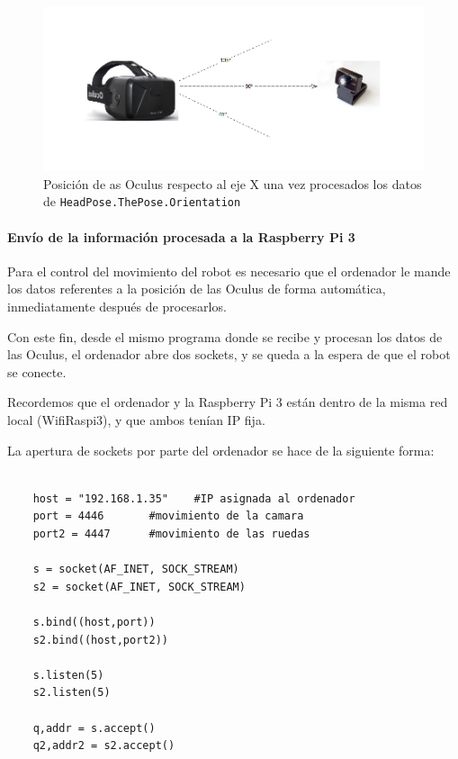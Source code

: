 \documentclass[twoside, 12pt]{epstfg}
\begin{document}
\begin{figure}[h!]
	\centerline{
		\mbox{\includegraphics[width=.80\textwidth]{images/Oculusgrados2.png}}
	}
	\caption{Posición de as Oculus respecto al eje X una vez procesados los datos de \texttt{HeadPose.ThePose.Orientation}}
\end{figure}
\newpage
\paragraph{Envío de la información procesada a la Raspberry Pi 3}



Para el control del movimiento del robot es necesario que el ordenador le mande los datos referentes a la posición de las Oculus de forma automática, inmediatamente después de procesarlos.

Con este fin, desde el mismo programa donde se recibe y procesan los datos de las Oculus, el ordenador abre dos sockets, y se queda a la espera de que el robot se conecte.

Recordemos que el ordenador y la Raspberry Pi 3 están dentro de la misma red local (WifiRaspi3), y que ambos tenían IP fija.

La apertura de sockets por parte del ordenador se hace de la siguiente forma:

\lstset{language=python, breaklines=true, basicstyle=\footnotesize}
\begin{lstlisting}[frame=single]

	host = "192.168.1.35"    #IP asignada al ordenador
	port = 4446       #movimiento de la camara
	port2 = 4447      #movimiento de las ruedas

	s = socket(AF_INET, SOCK_STREAM)
	s2 = socket(AF_INET, SOCK_STREAM)

	s.bind((host,port))
	s2.bind((host,port2))

	s.listen(5)
	s2.listen(5)

	q,addr = s.accept()
	q2,addr2 = s2.accept()

\end{lstlisting}
\end{document}
